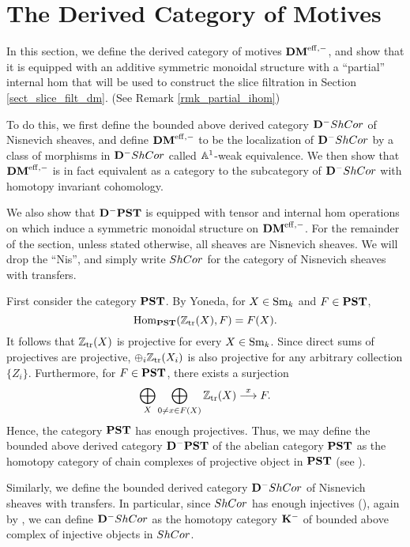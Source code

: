 \newpage
\section{The Derived Category of Motives}\label{sect_dmeff_and_dm}

In this section, we define the derived category of motives $\DMeff$,
and show that it is equipped with an additive symmetric monoidal 
structure with a ``partial'' internal hom that will be used to 
construct the slice filtration in Section 
\ref{sect_slice_filt_dm}. (See Remark \ref{rmk_partial_ihom})

To do this, we first define the bounded above derived category 
$\DCat^-\ShCor$ of Nisnevich sheaves, and define $\DMeff$ to be
the localization of $\DCat^-\ShCor$ by a class of morphisms in
$\DCat^-\ShCor$ called $\A^1$-weak equivalence. We then show that
$\DMeff$ is in fact equivalent as a category to the subcategory
of $\DCat^-\ShCor$ with homotopy invariant cohomology. 

We also show that $\DCat^-\PST$ is equipped with tensor and 
internal hom operations on which induce a symmetric monoidal 
structure on $\DMeff$. For the remainder of the section, unless 
stated otherwise, all sheaves are Nisnevich sheaves. We will drop 
the ``Nis'', and simply write $\ShCor$ for the category of 
Nisnevich sheaves with transfers.

First consider the category $\PST$. By Yoneda, for $X \in \Sm$ and
$F \in \PST$,
\[
\hom_{\PST}(\Ztr(X), F) = F(X).
\]
It follows that $\Ztr(X)$ is projective for every $X \in \Sm$.
Since direct sums of projectives are projective, 
$\oplus_i \Ztr(X_i)$ is also projective for any arbitrary 
collection $\{Z_i\}$. Furthermore, for $F \in \PST$, there exists 
a surjection
\begin{equation}\label{eq_res_by_rep}
\bigoplus_{X} \bigoplus_{0 \neq x \in F(X)} \Ztr(X) 
   \stackrel{x}{\to} F.
\end{equation}
Hence, the category $\PST$ has enough projectives. Thus, we may 
define the bounded above derived category $\DCat[D]^-\PST$ of the 
abelian category $\PST$ as the homotopy category of chain 
complexes of projective object in $\PST$ (see 
\cite[Thm. 10.4.8]{WH}).

Similarly, we define the bounded derived category $\DCat^- \ShCor$
of Nisnevich sheaves with transfers. In particular, since $\ShCor$
has enough injectives (\cite[Thm. 13.1]{MVW}), again by 
\cite[Thm. 10.4.8]{WH}, we can define $\DCat^-\ShCor$ as the homotopy
category $\DCat[K]^-$ of bounded above complex of injective objects
in $\ShCor$. 

